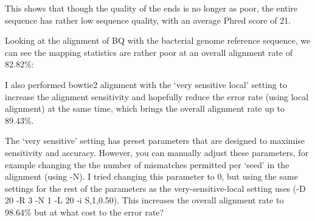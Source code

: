 \documentclass[]{article}
\newenvironment{Shaded}{\begin{snugshade}}{\end{snugshade}}
\newcommand{\FunctionTok}[1]{\textcolor[rgb]{0.00,0.00,0.00}{#1}}
\newcommand{\VariableTok}[1]{\textcolor[rgb]{0.00,0.00,0.00}{#1}}
\newcommand{\OperatorTok}[1]{\textcolor[rgb]{0.81,0.36,0.00}{\textbf{#1}}}
\newcommand{\BuiltInTok}[1]{#1}
\newcommand{\NormalTok}[1]{#1}
\begin{document}
This shows that though the quality of the ends is no longer as poor, the
entire sequence has rather low sequence quality, with an average Phred
score of 21.

Looking at the alignment of BQ with the bacterial genome reference
sequence, we can see the mapping statistics are rather poor at an
overall alignment rate of 82.82\%:

\begin{Shaded}
\end{Shaded}

I also performed bowtie2 alignment with the `very sensitive local'
setting to increase the alignment sensitivity and hopefully reduce the
error rate (using local alignment) at the same time, which brings the
overall alignment rate up to 89.43\%.

\begin{Shaded}
\end{Shaded}

The `very sensitive' setting has preset parameters that are designed to
maximise sensitivity and accuracy. However, you can manually adjust
these parameters, for example changing the the number of mismatches
permitted per `seed' in the alignment (using -N). I tried changing this
parameter to 0, but using the same settings for the rest of the
parameters as the very-sensitive-local setting uses (-D 20 -R 3 -N 1 -L
20 -i S,1,0.50). This increases the overall alignment rate to 98.64\%
but at what cost to the error rate?
\end{document}
